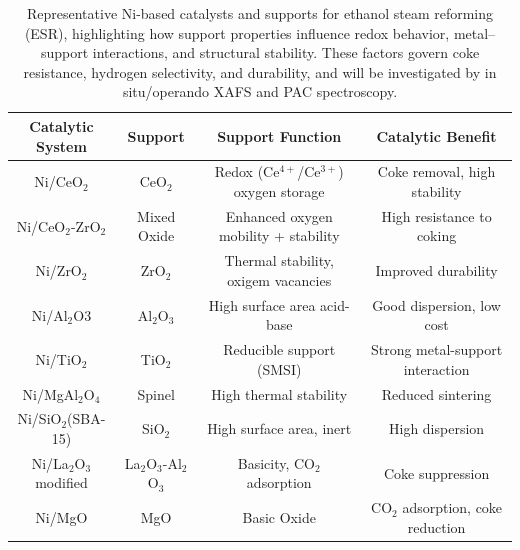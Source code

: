 \begin{table}[]
    \centering
    \begin{tabular}{|c|c|c|c|}
   
    \hline
 
     \bf Catalytic System & \bf Support & \bf Support Function & \bf Catalytic Benefit \\

     \hline
     Ni/CeO$_2$ & CeO$_2$ & \small Redox (Ce$^{4+}$/Ce$^{3+}$) oxygen storage  &  Coke removal, high stability \\
     \hline

     Ni/CeO$_2$-ZrO$_2$ & \small Mixed Oxide & \small Enhanced oxygen mobility + stability & High resistance to coking \\
     \hline
     
     Ni/ZrO$_2$ & ZrO$_2$ & \small Thermal stability, oxigem vacancies & Improved durability \\
     \hline
     
     Ni/Al$_2$O$3$ & Al$_2$O$_3$ & High surface area acid-base & Good dispersion, low cost \\
     \hline
     
     Ni/TiO$_2$ & TiO$_2$ & Reducible support (SMSI) & \small Strong metal-support interaction\\
     \hline
     
     Ni/MgAl$_2$O$_4$ & Spinel & High thermal stability & Reduced sintering \\
     \hline
     
     \small Ni/SiO$_2$(SBA-15) & SiO$_2$ & High surface area, inert & High dispersion\\
     \hline
     
    \small Ni/La$_2$O$_3$ modified & \small La$_2$O$_3$-Al$_2$O$_3$ & Basicity, CO$_2$ adsorption & Coke suppression \\
     \hline
     
     Ni/MgO & MgO & Basic Oxide & \small CO$_2$ adsorption, coke reduction\\
     
     \hline
     
         
    \end{tabular}
    \caption{Representative Ni-based catalysts and supports for ethanol steam reforming (ESR), highlighting how support properties influence redox behavior, metal–support interactions, and structural stability. These factors govern coke resistance, hydrogen selectivity, and durability, and will be investigated by in situ/operando XAFS and PAC spectroscopy.}
    \label{tablecatalytic}
\end{table}

